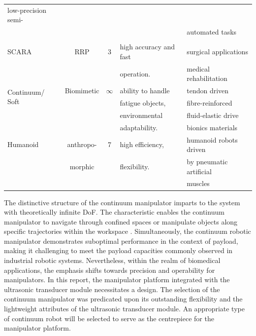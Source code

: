 \begin{center}
\begin{longtable}{l c c l l}
    low-precision semi- \\
    & & & & automated tasks \cite{RRR_application1,RRR_application2}\\
    & & & & \\
    SCARA \cite{SCARA_review}& RRP & 3 & 
    high accuracy and fast  &
    surgical applications \cite{SCARA_application1}\\
    & & & operation. & medical rehabilitation \cite{SCARA_application2}\\
    \multirow{2}{25mm}{Continuum/ Soft \cite{soft_review1,soft_review2}} & Biomimetic & $\infty$ & 
    ability to handle  & 
    tendon driven \cite{tenden_driven_application1, tenden_driven_application2,tenden_driven_application3}\\
    & & & fatigue objects, & fibre-reinforced \cite{fiber_application1,fiber_application2}\\
    & & & environmental & fluid-elastic drive \cite{fluid_application1,fluid_application2,fluid_application3}\\
    & & & adaptability. & bionics materials \cite{SMA,dielectric_high-elastic_polymers,IPMC}\\
    Humanoid & anthropo- & 7 & high efficiency, & humanoid robots driven \\
    & morphic& & flexibility.& by pneumatic artificial\\ 
    & & & & muscles \cite{humanoid_7dof}\\ \hline
    \end{longtable}
\end{center}
\vspace{-10mm}

The distinctive structure of the continuum manipulator imparts to the system with theoretically 
infinite DoF. The characteristic enables the continuum manipulator to navigate through confined spaces 
or manipulate objects along specific trajectories within the workspace \cite{CR_medical_application,
soft_review1,soft_review2}. Simultaneously, the continuum robotic
manipulator demonstrates suboptimal performance in the context of payload, making it challenging to meet 
the payload capacities commonly observed in industrial robotic systems. Nevertheless, within the realm 
of biomedical applications, the emphasis shifts towards precision and operability for manipulators. In this 
report, the manipulator platform integrated with the ultrasonic transducer module necessitates a design. 
The selection of the continuum manipulator was predicated upon its outstanding flexibility and the 
lightweight attributes of the ultrasonic transducer module. An appropriate type of continuum robot 
will be selected to serve as the centrepiece for the manipulator platform.
